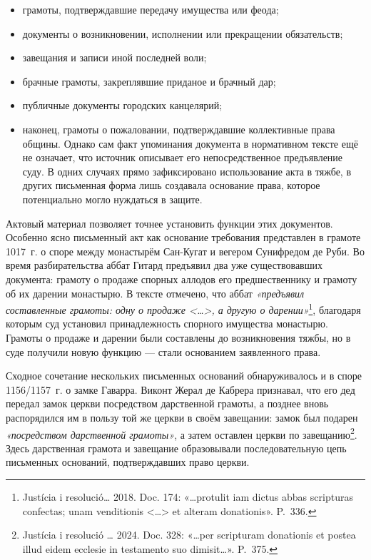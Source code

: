 \begin{itemize}
\item грамоты, подтверждавшие передачу имущества или феода;
\item документы о возникновении, исполнении или прекращении обязательств;
\item завещания и записи иной последней воли;
\item брачные грамоты, закреплявшие приданое и брачный дар;
\item публичные документы городских канцелярий;
\item наконец, грамоты о пожаловании, подтверждавшие коллективные права общины. Однако сам факт упоминания документа в нормативном тексте ещё не означает, что источник описывает его непосредственное предъявление суду. В одних случаях прямо зафиксировано использование акта в тяжбе, в других письменная форма лишь создавала основание права, которое потенциально могло нуждаться в защите.
\end{itemize}
Актовый материал позволяет точнее установить функции этих документов. Особенно ясно письменный акт как основание требования представлен в грамоте 1017~г. о споре между монастырём Сан-Кугат и вегером Сунифредом де Руби. Во время разбирательства аббат Гитард предъявил два уже существовавших документа: грамоту о продаже спорных аллодов его предшественнику и грамоту об их дарении монастырю. В тексте отмечено, что аббат \emph{«предъявил составленные грамоты: одну о продаже <…>, а другую о дарении»}\footnote{Justícia i resolució… 2018. Doc. 174: «…protulit iam dictus abbas scripturas confectas; unam venditionis <…> et alteram donationis». P.~336.}, благодаря которым суд установил принадлежность спорного имущества монастырю. Грамоты о продаже и дарении были составлены до возникновения тяжбы, но в суде получили новую функцию --- стали основанием заявленного права.

Сходное сочетание нескольких письменных оснований обнаруживалось и в споре 1156/1157~г. о замке Гаварра. Виконт Жерал де Кабрера признавал, что его дед передал замок церкви посредством дарственной грамоты, а позднее вновь распорядился им в пользу той же церкви в своём завещании: замок был подарен \emph{«посредством дарственной грамоты»}, а затем оставлен церкви по завещанию\footnote{Justícia i resolució … 2024. Doc. 328: «…per scripturam donationis et postea illud eidem ecclesie in testamento suo dimisit…». P.~375.}. Здесь дарственная грамота и завещание образовывали последовательную цепь письменных оснований, подтверждавших право церкви.

